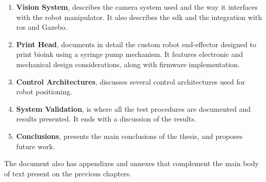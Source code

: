 \begin{enumerate}
    \item \textbf{Vision System}, describes the camera system used and the way it interfaces with the robot manipulator. It also describes the \gls{sdk} and the integration with \gls{ros} and Gazebo.
    
    \item \textbf{Print Head}, documents in detail the custom robot end-effector designed to print bioink using a syringe pump mechanism. It features electronic and mechanical design considerations, along with firmware implementation.
    
    \item \textbf{Control Architectures}, discusses several control architectures used for robot positioning.
    
    \item \textbf{System Validation}, is where all the test procedures are documented and results presented. It ends with a discussion of the results.
    
    \item \textbf{Conclusions}, presents the main conclusions of the thesis, and proposes future work.
\end{enumerate}

The document also has appendixes and annexes that complement the main body of text present on the previous chapters.


